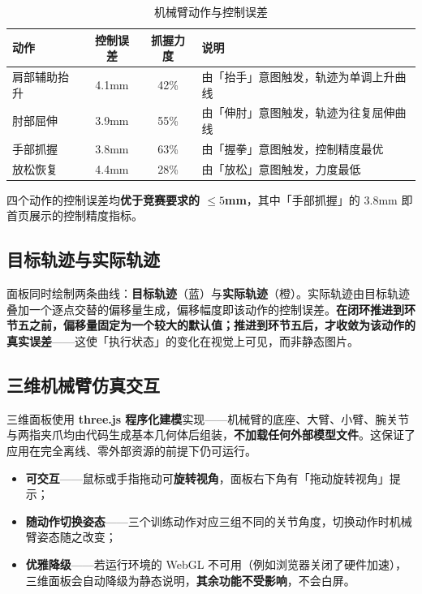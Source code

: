 \documentclass[11pt, a4paper]{ctexart}
\begin{document}
\begin{table}[htbp]
\centering
\caption{机械臂动作与控制误差}
\begin{tabularx}{\textwidth}{@{}l c c X@{}}
\toprule
\sffamily\bfseries 动作 & \sffamily\bfseries 控制误差 & \sffamily\bfseries 抓握力度 & \sffamily\bfseries 说明 \\
\midrule
肩部辅助抬升 & 4.1mm & 42\% & 由「抬手」意图触发，轨迹为单调上升曲线 \\
肘部屈伸     & 3.9mm & 55\% & 由「伸肘」意图触发，轨迹为往复屈伸曲线 \\
手部抓握     & 3.8mm & 63\% & 由「握拳」意图触发，控制精度最优 \\
放松恢复     & 4.4mm & 28\% & 由「放松」意图触发，力度最低 \\
\bottomrule
\end{tabularx}
\end{table}

四个动作的控制误差均\textbf{优于竞赛要求的 $\le 5$mm}，其中「手部抓握」的 3.8mm 即首页展示的控制精度指标。

\subsection{目标轨迹与实际轨迹}

面板同时绘制两条曲线：\textbf{目标轨迹}（蓝）与\textbf{实际轨迹}（橙）。实际轨迹由目标轨迹叠加一个逐点交替的偏移量生成，偏移幅度即该动作的控制误差。\textbf{在闭环推进到环节五之前，偏移量固定为一个较大的默认值；推进到环节五后，才收敛为该动作的真实误差}——这使「执行状态」的变化在视觉上可见，而非静态图片。

\subsection{三维机械臂仿真交互}

三维面板使用 \textbf{three.js 程序化建模}实现——机械臂的底座、大臂、小臂、腕关节与两指夹爪均由代码生成基本几何体后组装，\textbf{不加载任何外部模型文件}。这保证了应用在完全离线、零外部资源的前提下仍可运行。

\begin{itemize}[itemsep=3pt, topsep=4pt]
  \item \textbf{可交互}——鼠标或手指拖动可\textbf{旋转视角}，面板右下角有「拖动旋转视角」提示；
  \item \textbf{随动作切换姿态}——三个训练动作对应三组不同的关节角度，切换动作时机械臂姿态随之改变；
  \item \textbf{优雅降级}——若运行环境的 WebGL 不可用（例如浏览器关闭了硬件加速），三维面板会自动降级为静态说明，\textbf{其余功能不受影响}，不会白屏。
\end{itemize}
\end{document}

